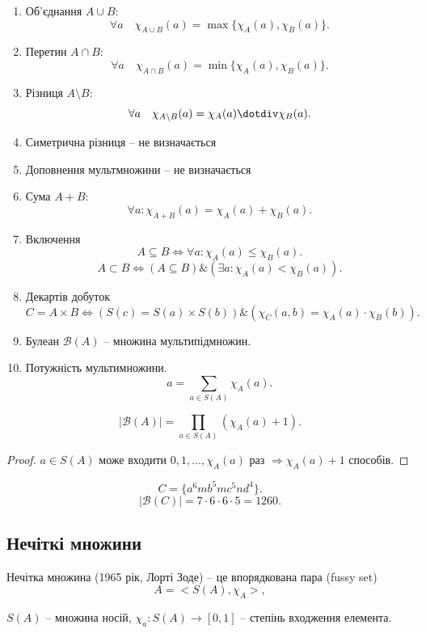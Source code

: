 \begin{enumerate}
    \item Об'єднання $A \cup B$:
        $$\forall a \quad \chi_{A \cup B}(a) = \max \{ \chi_A(a), \chi_B(a) \}.$$
    \item Перетин $A \cap B$:
        $$\forall a \quad \chi_{A \cap B}(a) = \min \{ \chi_A(a), \chi_B(a) \}.$$
    \item Різниця $A \setminus B$:
        $$\forall a \quad \chi_{A \setminus B}(a) = \chi_A(a) \dotdiv \chi_B(a).$$
    \item Симетрична різниця -- не визначається
    \item Доповнення мультмножини -- не визначається
    \item Сума $A + B$:
        $$\forall a: \chi_{A + B}(a) = \chi_{A}(a) + \chi_{B}(a).$$
    \item Включення
        $$A \subseteq B \Leftrightarrow \forall a: \chi_A(a) \leqslant \chi_B(a).$$
        $$A \subset B \Leftrightarrow (A \subseteq B) \& (\exists a: \chi_A(a) < \chi_B(a)).$$
    \item Декартів добуток
        $$C = A \times B \Leftrightarrow (S(c) = S(a) \times S(b)) \& (\chi_C(a, b) = \chi_A(a) \cdot \chi_B(b)).$$
    \item Булеан $\mathcal{B}(A)$ -- множина мультипідмножин.
    \item Потужність мультимножини.
        $$a = \sum\limits_{a \in S(A)} \chi_A(a).$$
\end{enumerate}

\begin{theorem}
    $$|\mathcal{B}(A)| = \prod\limits_{a \in S(A)} \left( \chi_A(a) + 1 \right).$$
\end{theorem}
\begin{proof}
    $a \in S(A)$ може входити $0, 1, ..., \chi_A(a)$ раз
    $\Rightarrow \chi_A(a) + 1$ способів.
\end{proof}

\begin{example}
    $$C = \{ a^6m b^5m c^5n d^4 \}.$$
    $$|\mathcal{B}(C)| = 7 \cdot 6  \cdot 6 \cdot 5 = 1260.$$
\end{example}

\subsection{Нечіткі множини}

\begin{definition}
    Нечітка множина (1965 рік, Лорті Зоде) -- це впорядкована
    пара (fussy set)
    $$A = <S(A), \chi_A>,$$

    $S(A)$ -- множина носій,
    $\chi_a: S(A) \rightarrow [0, 1]$ -- степінь входження елемента.
\end{definition}

